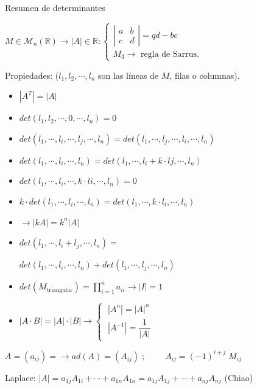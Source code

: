 \begin{myalertblock}{Resumen de determinantes}

$M \in \mathcal M_n(\mathbb R) \to |A|\in \mathbb R: \begin{cases} 
 \left| \begin{matrix} a&b\\c&d \end{matrix} \right|	=qd-bc \\ M_3 \to \text{ regla de Sarrus.}
 \end{cases}$
 
 Propiedades: \small{($l_1,l_2,\cdots , l_n$ son las líneas de $M$, filas o columnas)}\normalsize{.}
 
 \begin{itemize}
 
 \item $|A^T|=|A|$
 \item $det(l_1,l_2,\cdots ,0,\cdots, l_n)=0$
 \item $det(l_1,\cdots ,l_i, \cdots , l_j, \cdots , l_n)=det(l_1,\cdots ,l_j, \cdots , l_i, \cdots , l_n)$
 \item $det(l_1,\cdots ,l_i, \cdots , l_n)=det(l_1,\cdots ,l_i+k\cdot lj, \cdots , l_n)$
 \item $det(l_1,\cdots ,l_i, \cdots ,k\cdot li, \cdots , l_n)=0$
 \item $k \cdot det(l_1,\cdots ,l_i, \cdots , l_n)=det(l_1,\cdots ,k\cdot l_i, \cdots , l_n)$
 \item $\longrightarrow  |kA|=k^n|A|$
 \item $det(l_1,\cdots ,l_i+l_j, \cdots , l_n)=$
 	
 	$det(l_1,\cdots ,l_i, \cdots , l_n)+det(l_1,\cdots ,l_j, \cdots , l_n)$
 \item $\displaystyle det(M_{\text{triangular}})=\prod_{i=1}^n a_{ii} \longrightarrow |I|=1$
 \item $|A\cdot B|=|A|\cdot |B| \longrightarrow \begin{cases}\; |A^n|=|A|^n \\  \; |A^{-1}|= \dfrac 1 {|A|} \end{cases} $
 	
 \end{itemize}
 
 $A=(a_{ij})= \to ad(A)=(A_{ij})\; ;\;  \qquad A_{ij}=(-1)^{i+j}\; M_{ij}$
 
 \vspace{2mm}Laplace: \small{$|A|= a_{1j}A_{1i}+\cdots +a_{1n}A_{1n}=a_{1j}A_{1j}+\cdots +a_{nj}A_{nj}$} \normalsize{(Chiao)}
 

\end{myalertblock}

